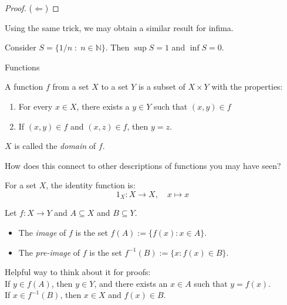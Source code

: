 \documentclass [aspectratio=169, handout]{beamer}
\newcommand{\N}{{\mathbb{N}}}
\begin{document}
\begin{frame}

\begin{proof}
($\Leftarrow$) 
\vspace{3cm}
\end{proof}

Using the same trick, we may obtain a similar result for infima.

\vspace{1em}

\begin{example}
Consider $S = \{1/n \; \colon \; n\in \N\}$. Then $\sup S = 1$ and $\inf S = 0$.
\end{example}
\end{frame}

\begin{frame}{Functions}
\begin{definition}
A function $f$ from a set $X$ to a set $Y$ is a subset of $X \times Y$ with the properties:
\begin{enumerate}
    \item For every $x \in X$, there exists a $y \in Y$ such that $(x,y) \in f$
    \item If $(x,y) \in f$ and $(x,z) \in f$, then $y = z$.
\end{enumerate}
$X$ is called the \emph{domain} of $f$.
\end{definition}
How does this connect to other descriptions of functions you may have seen?
\vspace{2em}

\begin{example}
For a set $X$, the identity function is:
$$ 1_X: X \to X, \quad x \mapsto x $$
\end{example}
\end{frame}



\begin{frame}
\begin{definition}
Let $f:X \to Y$ and $A \subseteq X$ and $B \subseteq Y$. 
\begin{itemize}
\item The \emph{image} of $f$ is the set $f(A) := \{f(x): x \in A \}$.
\item The \emph{pre-image} of $f$ is the set $f^{-1}(B) := \{x: f(x) \in B \}$.
\end{itemize}
\end{definition}

\vspace{1em}

Helpful way to think about it for proofs: \\
If $y \in f(A)$, then $y \in Y$, and there exists an $x \in A$ such that $y = f(x)$. \\
If $x \in f^{-1}(B)$, then $x \in X$ and $f(x) \in B$.


\end{frame}
\end{document}
